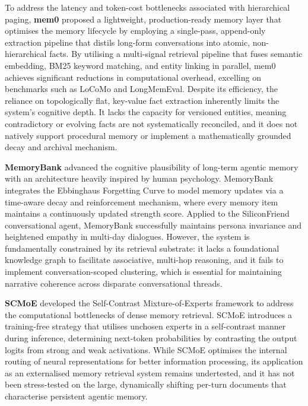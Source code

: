 \documentclass[10pt]{article}
\begin{document}
To address the latency and token-cost bottlenecks associated with hierarchical paging, \textbf{mem0} \citep{chhikara2025mem0} proposed a lightweight, production-ready memory layer that optimises the memory lifecycle by employing a single-pass, append-only extraction pipeline that distils long-form conversations into atomic, non-hierarchical facts. By utilising a multi-signal retrieval pipeline that fuses semantic embedding, BM25 keyword matching, and entity linking in parallel, mem0 achieves significant reductions in computational overhead, excelling on benchmarks such as LoCoMo and LongMemEval. Despite its efficiency, the reliance on topologically flat, key-value fact extraction inherently limits the system's cognitive depth. It lacks the capacity for versioned entities, meaning contradictory or evolving facts are not systematically reconciled, and it does not natively support procedural memory or implement a mathematically grounded decay and archival mechanism.

\textbf{MemoryBank} \citep{zhong2024memorybank} advanced the cognitive plausibility of long-term agentic memory with an architecture heavily inspired by human psychology. MemoryBank integrates the Ebbinghaus Forgetting Curve to model memory updates via a time-aware decay and reinforcement mechanism, where every memory item maintains a continuously updated strength score. Applied to the SiliconFriend conversational agent, MemoryBank successfully maintains persona invariance and heightened empathy in multi-day dialogues. However, the system is fundamentally constrained by its retrieval substrate: it lacks a foundational knowledge graph to facilitate associative, multi-hop reasoning, and it fails to implement conversation-scoped clustering, which is essential for maintaining narrative coherence across disparate conversational threads.

\textbf{SCMoE} \citep{shi2024scmoe} developed the Self-Contrast Mixture-of-Experts framework to address the computational bottlenecks of dense memory retrieval. SCMoE introduces a training-free strategy that utilises unchosen experts in a self-contrast manner during inference, determining next-token probabilities by contrasting the output logits from strong and weak activations. While SCMoE optimises the internal routing of neural representations for better information processing, its application as an externalised memory retrieval system remains undertested, and it has not been stress-tested on the large, dynamically shifting per-turn documents that characterise persistent agentic memory.
\end{document}
